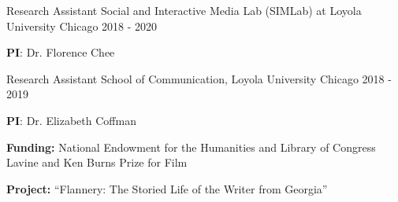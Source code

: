 \begin{cventries}
    \cventry
    {Research Assistant} %
    {Social and Interactive Media Lab (SIMLab) at Loyola University Chicago} %
    {} %
    {2018 - 2020} %
    {
      \begin{cvitems} %
         \item[] {\textbf{PI}: Dr. Florence Chee}
      \end{cvitems}
    }
    
    \cventry
    {Research Assistant} %
    {School of Communication, Loyola University Chicago} %
    {} %
    {2018 - 2019} %
    {
      \begin{cvitems} %
              \item[] {\textbf{PI}: Dr. Elizabeth Coffman}
              \item[] {\textbf{Funding: }National Endowment for the Humanities and Library of Congress Lavine and Ken Burns Prize for Film}
              \item[] {\textbf{Project: }“Flannery: The Storied Life of the Writer from Georgia”}
      \end{cvitems}
    }
    

\end{cventries}

